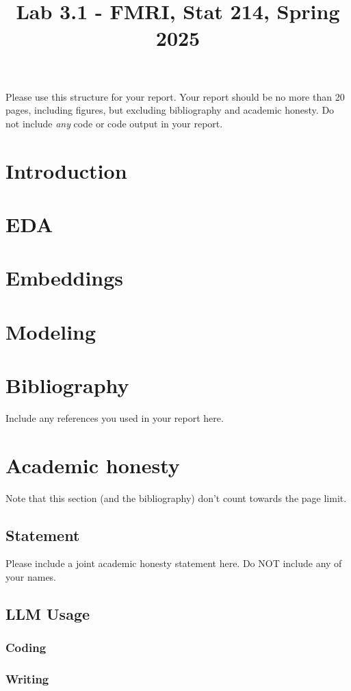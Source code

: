 \documentclass[10pt,letterpaper]{article}
\title{Lab 3.1 - FMRI, Stat 214, Spring 2025\vspace{-2em}}
\begin{document}
\maketitle

Please use this structure for your report. Your report should be no more than 20 pages, including figures, but excluding bibliography and academic honesty. Do not include \emph{any} code or code output in your report. 

\section{Introduction}

\section{EDA}

\section{Embeddings}

\section{Modeling}

\section{Bibliography}
Include any references you used in your report here.
\appendix
\section{Academic honesty}
Note that this section (and the bibliography) don't count towards the page limit.
\subsection{Statement}
Please include a joint academic honesty statement here. Do NOT include any of your names.
\subsection{LLM Usage}


\subsubsection*{Coding}

\subsubsection*{Writing}
\end{document}

